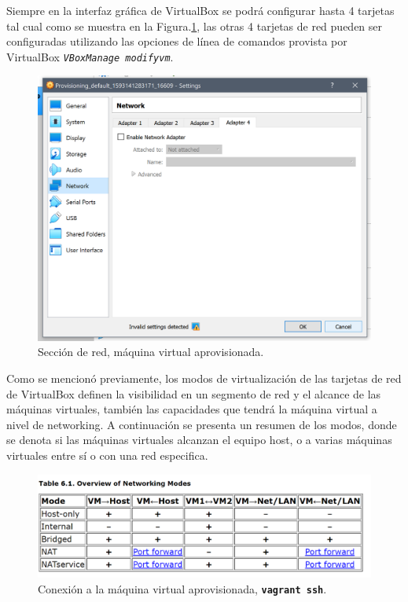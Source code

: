 \documentclass[letterpaper, 12pt, oneside]{article}
\begin{document}
    Siempre en la interfaz gráfica de VirtualBox se podrá configurar hasta 4 tarjetas tal cual como se muestra en la Figura.\ref{fig:net1}, las otras 4 tarjetas de red pueden ser configuradas utilizando las opciones de línea de comandos provista por VirtualBox \textit{\texttt{VBoxManage modifyvm}}\cite{vbnet1}.
    
    \begin{figure}[H]
        \includegraphics[scale=0.8]{img/networking/networking1.png}
        \caption{Sección de red, máquina virtual aprovisionada.}
        \label{fig:net1}
    \end{figure}
    Como se mencionó previamente, los modos de virtualización de las tarjetas de red de VirtualBox definen la visibilidad en un segmento de red y el alcance de las máquinas virtuales, también las capacidades que tendrá la máquina virtual a nivel de networking. A continuación se presenta un resumen de los modos, donde se denota si las máquinas virtuales alcanzan el equipo host, o a varias máquinas virtuales entre sí o con una red especifica.
    
    \begin{figure}[H]
        \includegraphics[scale=0.8]{img/networking/networking3.png}
        \caption{Conexión a la máquina virtual aprovisionada, \textbf{\texttt{vagrant ssh}}.}
        \label{fig:net33}
    \end{figure}
    
\end{document}
